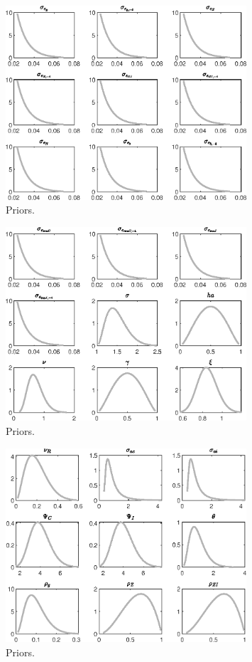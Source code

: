  
\begin{figure}[H]
\centering
\includegraphics[width=0.80\textwidth]{BRS_sectoral_wo_gmf/graphs/BRS_sectoral_wo_gmf_Priors1}
\caption{Priors.}\label{Fig:Priors:1}
\end{figure}
\begin{figure}[H]
\centering
\includegraphics[width=0.80\textwidth]{BRS_sectoral_wo_gmf/graphs/BRS_sectoral_wo_gmf_Priors2}
\caption{Priors.}\label{Fig:Priors:2}
\end{figure}
\begin{figure}[H]
\centering
\includegraphics[width=0.80\textwidth]{BRS_sectoral_wo_gmf/graphs/BRS_sectoral_wo_gmf_Priors3}
\caption{Priors.}\label{Fig:Priors:3}
\end{figure}
